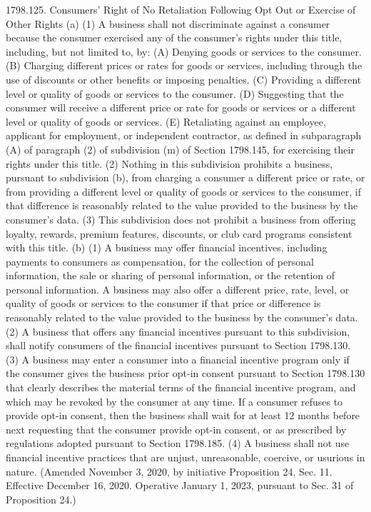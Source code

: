 1798.125.  Consumers’ Right of No Retaliation Following Opt Out or Exercise of Other Rights
(a) (1) A business shall not discriminate against a consumer because the consumer exercised any of the consumer’s rights under this title, including, but not limited to, by:
(A) Denying goods or services to the consumer.
(B) Charging different prices or rates for goods or services, including through the use of discounts or other benefits or imposing penalties.
(C) Providing a different level or quality of goods or services to the consumer.
(D) Suggesting that the consumer will receive a different price or rate for goods or services or a different level or quality of goods or services.
(E) Retaliating against an employee, applicant for employment, or independent contractor, as defined in subparagraph (A) of paragraph (2) of subdivision (m) of Section 1798.145, for exercising their rights under this title.
(2) Nothing in this subdivision prohibits a business, pursuant to subdivision (b), from charging a consumer a different price or rate, or from providing a different level or quality of goods or services to the consumer, if that difference is reasonably related to the value provided to the business by the consumer’s data.
(3) This subdivision does not prohibit a business from offering loyalty, rewards, premium features, discounts, or club card programs consistent with this title.
(b) (1) A business may offer financial incentives, including payments to consumers as compensation, for the collection of personal information, the sale or sharing of personal information, or the retention of personal information. A business may also offer a different price, rate, level, or quality of goods or services to the consumer if that price or difference is reasonably related to the value provided to the business by the consumer’s data.
(2) A business that offers any financial incentives pursuant to this subdivision, shall notify consumers of the financial incentives pursuant to Section 1798.130.
(3) A business may enter a consumer into a financial incentive program only if the consumer gives the business prior opt-in consent pursuant to Section 1798.130 that clearly describes the material terms of the financial incentive program, and which may be revoked by the consumer at any time. If a consumer refuses to provide opt-in consent, then the business shall wait for at least 12 months before next requesting that the consumer provide opt-in consent, or as prescribed by regulations adopted pursuant to Section 1798.185.
(4) A business shall not use financial incentive practices that are unjust, unreasonable, coercive, or usurious in nature.
(Amended November 3, 2020, by initiative Proposition 24, Sec. 11. Effective December 16, 2020. Operative January 1, 2023, pursuant to Sec. 31 of Proposition 24.)

